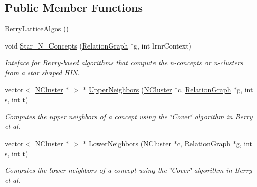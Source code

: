 \subsection*{Public Member Functions}
\begin{DoxyCompactItemize}
\item 
\hyperlink{class_berry_lattice_algos_a02d8e6dd215d9925422adff01208a06c}{BerryLatticeAlgos} ()
\item 
void \hyperlink{class_berry_lattice_algos_aa740db0f43531fc872f94c062efe59b9}{Star\_\-N\_\-Concepts} (\hyperlink{class_relation_graph}{RelationGraph} $\ast$g, int lrnrContext)
\begin{DoxyCompactList}\small\item\em Inteface for Berry-\/based algorithms that compute the n-\/concepts or n-\/clusters from a star shaped HIN. \item\end{DoxyCompactList}\item 
vector$<$ \hyperlink{class_n_cluster}{NCluster} $\ast$ $>$ $\ast$ \hyperlink{class_berry_lattice_algos_a22c1daa784e7bf5017a40b313fcec221}{UpperNeighbors} (\hyperlink{class_n_cluster}{NCluster} $\ast$c, \hyperlink{class_relation_graph}{RelationGraph} $\ast$g, int s, int t)
\begin{DoxyCompactList}\small\item\em Computes the upper neighbors of a concept using the \char`\"{}Cover\char`\"{} algorithm in Berry et al. \item\end{DoxyCompactList}\item 
vector$<$ \hyperlink{class_n_cluster}{NCluster} $\ast$ $>$ $\ast$ \hyperlink{class_berry_lattice_algos_af33af014732c42bf75864cb492184104}{LowerNeighbors} (\hyperlink{class_n_cluster}{NCluster} $\ast$c, \hyperlink{class_relation_graph}{RelationGraph} $\ast$g, int s, int t)
\begin{DoxyCompactList}\small\item\em Computes the lower neighbors of a concept using the \char`\"{}Cover\char`\"{} algorithm in Berry et al. \item\end{DoxyCompactList}\end{DoxyCompactItemize}
